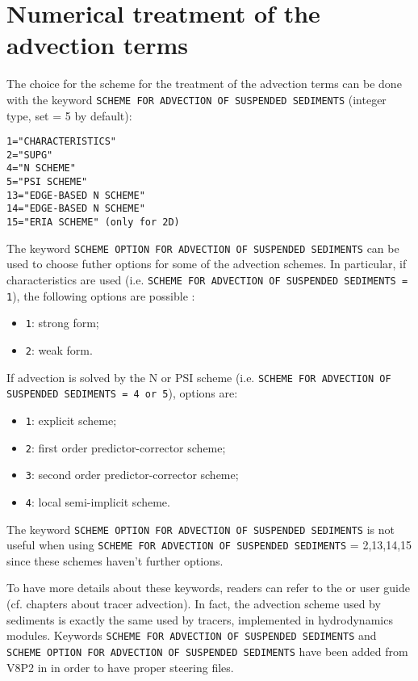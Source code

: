 \section{Numerical treatment of the advection terms}
The choice for the scheme for the treatment of the advection terms can be done with the keyword \texttt{SCHEME FOR ADVECTION OF SUSPENDED SEDIMENTS} (integer type, set {\ttfamily = 5} by default):
\begin{lstlisting}[frame=trBL]
1="CHARACTERISTICS"
2="SUPG"
4="N SCHEME"
5="PSI SCHEME"
13="EDGE-BASED N SCHEME"
14="EDGE-BASED N SCHEME"
15="ERIA SCHEME" (only for 2D)
\end{lstlisting}

The keyword \texttt{SCHEME OPTION FOR ADVECTION OF SUSPENDED SEDIMENTS} can be used to choose futher options for some of the advection schemes. In particular, if characteristics are used (i.e. \texttt{SCHEME FOR ADVECTION OF SUSPENDED SEDIMENTS = 1}), the following options are possible :
\begin{itemize}
\item \texttt{1}: strong form;
\item \texttt{2}: weak form.
\end{itemize}
If advection is solved by the N or PSI scheme (i.e. \texttt{SCHEME FOR ADVECTION OF SUSPENDED SEDIMENTS = 4 or 5}), options are:
\begin{itemize}
\item \texttt{1}: explicit scheme;
\item \texttt{2}: first order predictor-corrector scheme;
\item \texttt{3}: second order predictor-corrector scheme;
\item \texttt{4}: local semi-implicit scheme.
\end{itemize}
The keyword \texttt{SCHEME OPTION FOR ADVECTION OF SUSPENDED SEDIMENTS} is not
useful when using \texttt{SCHEME FOR ADVECTION OF SUSPENDED SEDIMENTS}
{\ttfamily = 2,13,14,15} since these schemes haven't further options.

To have more details about these keywords, readers can refer to the  or  user guide (cf. chapters about tracer advection). In fact, the advection scheme used by sediments is exactly the same used by tracers, implemented in hydrodynamics modules. Keywords \texttt{SCHEME FOR ADVECTION OF SUSPENDED SEDIMENTS} and \texttt{SCHEME OPTION FOR ADVECTION OF SUSPENDED SEDIMENTS} have been added from V8P2 in \gaia{} in order to have proper steering files.

